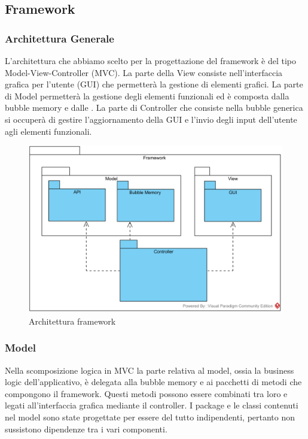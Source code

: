 \subsection{Framework}

\subsubsection{Architettura Generale}
L'architettura che abbiamo scelto per la progettazione del framework è del tipo Model-View-Controller (MVC). La parte della View consiste nell'interfaccia grafica per l'utente (GUI) che permetterà la gestione di elementi grafici. La parte di Model permetterà la gestione degli elementi funzionali ed è composta dalla bubble memory e dalle . La parte di Controller che consiste nella bubble generica si occuperà di gestire l'aggiornamento della GUI e l'invio degli input dell'utente agli elementi funzionali.

\begin{figure}[H]
	\centering
	\includegraphics[width=14cm]{diagrammi_img/classi_e_package/framework.png}
	\caption{Architettura framework}
\end{figure}

\subsubsection{Model}
Nella scomposizione logica in MVC la parte relativa al model, ossia la business logic dell'applicativo, è delegata alla bubble memory e ai pacchetti di metodi che compongono il framework. Questi metodi possono essere combinati tra loro e legati all'interfaccia grafica mediante il controller. I package e le classi contenuti nel model sono state progettate per essere del tutto indipendenti, pertanto non sussistono dipendenze tra i vari componenti.

